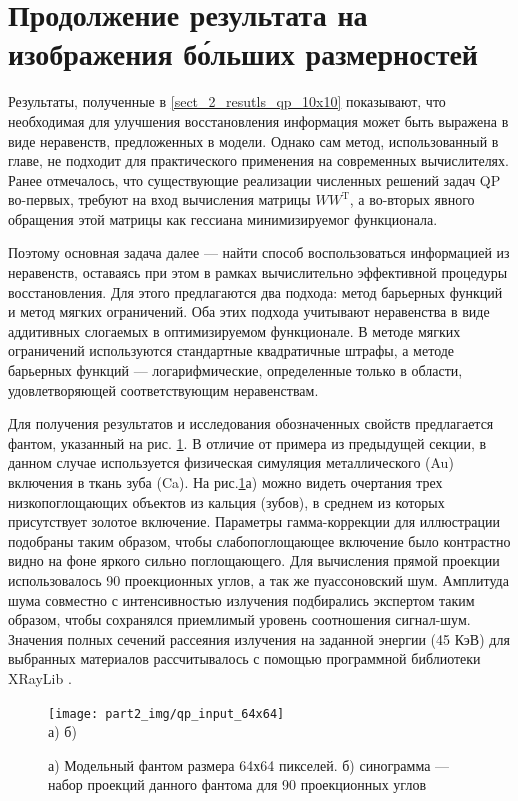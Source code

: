 \section{Продолжение результата на изображения б\'ольших размерностей}
Результаты, полученные в \ref{sect_2_resutls_qp_10x10} показывают, что необходимая для улучшения восстановления информация может быть выражена в виде неравенств, предложенных в модели.
Однако сам метод, использованный в главе, не подходит для практического применения на современных вычислителях.
Ранее отмечалось, что существующие реализации численных решений задач QP во-первых, требуют на вход вычисления матрицы $WW^{\mathrm T}$, а во-вторых явного обращения этой матрицы как гессиана минимизируемог функционала.

Поэтому основная задача далее --- найти способ воспользоваться информацией из неравенств, оставаясь при этом в рамках вычислительно эффективной процедуры восстановления.
Для этого предлагаются два подхода: метод барьерных функций и метод мягких ограничений. 
Оба этих подхода учитывают неравенства в виде аддитивных слогаемых в оптимизируемом функционале.
В методе мягких ограничений используются стандартные квадратичные штрафы, а методе барьерных функций --- логарифмические, определенные только в области, удовлетворяющей соответствующим неравенствам.

Для получения результатов и исследования обозначенных свойств предлагается фантом, указанный на рис. \ref{fig:qp_phantom_64by64}.
В отличие от примера из предыдущей секции, в данном случае используется физическая симуляция металлического (Au) включения в ткань зуба (Ca).
На рис.\ref{fig:qp_phantom_64by64}а) можно видеть очертания трех низкопоглощающих объектов из кальция (зубов), в среднем из которых присутствует золотое включение.
Параметры гамма-коррекции для иллюстрации подобраны таким образом, чтобы слабопоглощающее включение было контрастно видно на фоне яркого сильно поглощающего.
Для вычисления прямой проекции использовалось 90 проекционных углов, а так же пуассоновский шум.
Амплитуда шума совместно с интенсивностью излучения подбирались экспертом таким образом, чтобы сохранялся приемлимый уровень соотношения сигнал-шум.
Значения полных сечений рассеяния излучения на заданной энергии (45 КэВ) для выбранных материалов рассчитывалось с помощью программной библиотеки XRayLib \cite{xraylib}.

\begin{figure}
    \centering
    \texttt{[image: part2\_img/qp\_input\_64x64]} \\
    а) \hspace{0.5\textwidth} б)
    \caption{а) Модельный фантом размера 64х64 пикселей. б) синограмма --- набор проекций данного фантома для 90 проекционных углов}
    \label{fig:qp_phantom_64by64}
\end{figure}

